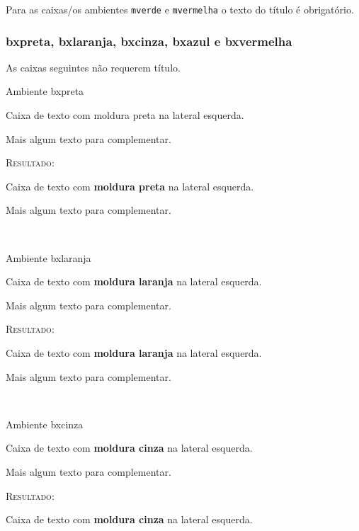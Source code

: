 \documentclass[a4paper,12pt,oneside,openright,extrafontsizes,openbib]{memoir}
\begin{document}
{Para as caixas/os ambientes \verb|mverde| e \verb|mvermelha| o texto do título é obrigatório.

\subsubsection{bxpreta, bxlaranja, bxcinza, bxazul e bxvermelha}

As caixas seguintes não requerem título.

\begin{codex}{Ambiente bxpreta}
	\begin{bxpreta}
	Caixa de texto com moldura preta na lateral esquerda. 
	
	Mais algum texto para complementar.   
	\end{bxpreta} 
\end{codex}

\textsc{Resultado:}
\begin{bxpreta}
	Caixa de texto com \textbf{moldura preta} na lateral esquerda. 
	
	Mais algum texto para complementar.     
\end{bxpreta} 
\ \\

\begin{codex}{Ambiente bxlaranja}
	\begin{bxlaranja}
	Caixa de texto com \textbf{moldura laranja} na lateral esquerda.  
	
	Mais algum texto para complementar.  
	\end{bxlaranja}
\end{codex}

\textsc{Resultado:}
\begin{bxlaranja}
	Caixa de texto com \textbf{moldura laranja} na lateral esquerda.
	
	Mais algum texto para complementar.   
\end{bxlaranja}
\ \\

\begin{codex}{Ambiente bxcinza}
	\begin{bxcinza}
	Caixa de texto com \textbf{moldura cinza} na lateral esquerda. 
	
	Mais algum texto para complementar.  
	\end{bxcinza}
\end{codex}

\textsc{Resultado:}
\begin{bxcinza}
	Caixa de texto com \textbf{moldura cinza} na lateral esquerda. 
	

\end{bxcinza}}
\end{document}
